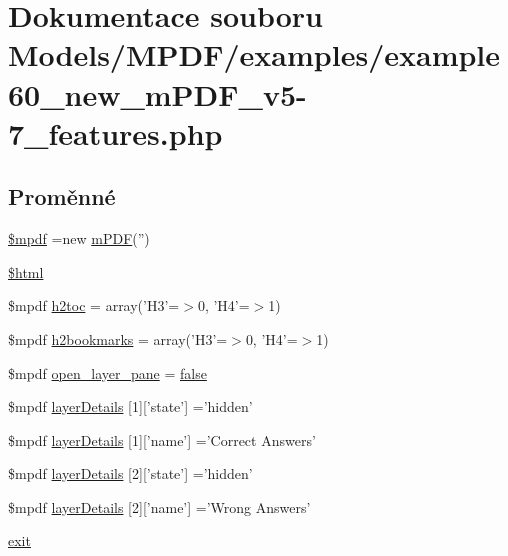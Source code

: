 \hypertarget{example60__new__m_p_d_f__v5-7__features_8php}{\section{Dokumentace souboru Models/\-M\-P\-D\-F/examples/example60\-\_\-new\-\_\-m\-P\-D\-F\-\_\-v5-\/7\-\_\-features.php}
\label{example60__new__m_p_d_f__v5-7__features_8php}
}
\subsection*{Proměnné}
\begin{DoxyCompactItemize}
\item 
\hyperlink{example60__new__m_p_d_f__v5-7__features_8php_ad028f81910d6cbab9b184d2214b3a8f8}{\$mpdf} =new \hyperlink{classm_p_d_f}{m\-P\-D\-F}('')
\item 
\hyperlink{example60__new__m_p_d_f__v5-7__features_8php_a6f96e7fc92441776c9d1cd3386663b40}{\$html}
\item 
\$mpdf \hyperlink{example60__new__m_p_d_f__v5-7__features_8php_aac5f519d93d5cc4e570c04f67028b10e}{h2toc} = array('H3'=$>$0, 'H4'=$>$1)
\item 
\$mpdf \hyperlink{example60__new__m_p_d_f__v5-7__features_8php_afb14621f469d666ef1cfb8cac3de8764}{h2bookmarks} = array('H3'=$>$0, 'H4'=$>$1)
\item 
\$mpdf \hyperlink{example60__new__m_p_d_f__v5-7__features_8php_a3a527a18648151234e1357136e372e18}{open\-\_\-layer\-\_\-pane} = \hyperlink{ttfontsuni_8php_afbaa04e5cc97693dc668b3c45d3dd740}{false}
\item 
\$mpdf \hyperlink{example60__new__m_p_d_f__v5-7__features_8php_a43d3ff8bf1b5cd7b05ce15303446ad98}{layer\-Details} \mbox{[}1\mbox{]}\mbox{[}'state'\mbox{]} ='hidden'
\item 
\$mpdf \hyperlink{example60__new__m_p_d_f__v5-7__features_8php_a0bb12771d2a57c8f14bfd6b89e3e15c8}{layer\-Details} \mbox{[}1\mbox{]}\mbox{[}'name'\mbox{]} ='Correct Answers'
\item 
\$mpdf \hyperlink{example60__new__m_p_d_f__v5-7__features_8php_ab987e5567e2db8ccd4d0cb2f07d2a5b2}{layer\-Details} \mbox{[}2\mbox{]}\mbox{[}'state'\mbox{]} ='hidden'
\item 
\$mpdf \hyperlink{example60__new__m_p_d_f__v5-7__features_8php_a338bee47f310e00da9962095ac76487d}{layer\-Details} \mbox{[}2\mbox{]}\mbox{[}'name'\mbox{]} ='Wrong Answers'
\item 
\hyperlink{example60__new__m_p_d_f__v5-7__features_8php_a6733eb5f605d09eaede9845835d71c4e}{exit}
\end{DoxyCompactItemize}


